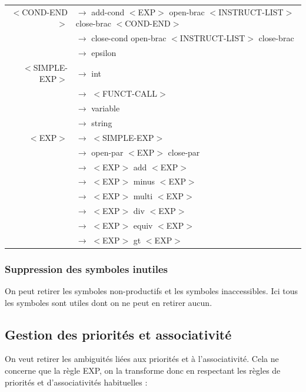 \documentclass[a4paper,10pt]{article}
\begin{document}
\begin{tabular}{rl}
$<$COND-END$>$		& $\rightarrow$ add-cond $<$EXP$>$ open-brac $<$INSTRUCT-LIST$>$ close-brac $<$COND-END$>$ \\
					& $\rightarrow$ close-cond open-brac $<$INSTRUCT-LIST$>$ close-brac\\
					& $\rightarrow$ epsilon \\
					
$<$SIMPLE-EXP$>$	& $\rightarrow$ int \\
					& $\rightarrow$ $<$FUNCT-CALL$>$ \\
					& $\rightarrow$ variable \\
					& $\rightarrow$ string \\				

$<$EXP$>$			& $\rightarrow$ $<$SIMPLE-EXP$>$   \\
					& $\rightarrow$ open-par $<$EXP$>$ close-par\\ 
					& $\rightarrow$ $<$EXP$>$ add $<$EXP$>$ \\
					& $\rightarrow$ $<$EXP$>$ minus $<$EXP$>$ \\
					& $\rightarrow$ $<$EXP$>$ multi $<$EXP$>$ \\
					& $\rightarrow$ $<$EXP$>$ div $<$EXP$>$ \\
					& $\rightarrow$ $<$EXP$>$ equiv $<$EXP$>$ \\
					& $\rightarrow$ $<$EXP$>$ gt $<$EXP$>$ \\
					
					
\end{tabular}

\subsubsection{Suppression des symboles inutiles}

	On peut retirer les symboles non-productifs et les symboles inaccessibles. Ici tous les symboles sont utiles dont on ne peut en retirer aucun.

\subsection{Gestion des priorités et associativité}
	On veut retirer les ambiguités liées aux priorités et à l'associativité. Cela ne concerne que la règle EXP, on la transforme donc en respectant les règles de priorités et d'associativités habituelles : \\
\end{document}
